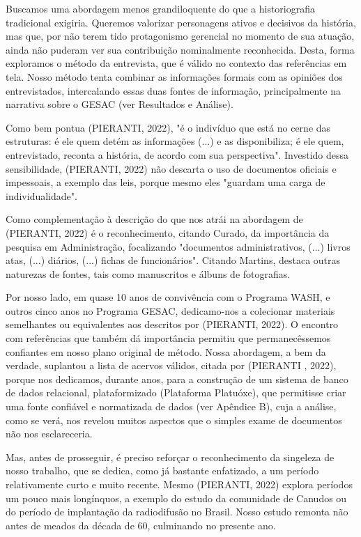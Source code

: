 Buscamos uma abordagem menos grandiloquente do que a historiografia tradicional exigiria. Queremos valorizar personagens ativos e decisivos da história, mas que, por não terem tido protagonismo gerencial no momento de sua atuação, ainda não puderam ver sua contribuição nominalmente reconhecida. Desta, forma exploramos o método da entrevista, que é válido no contexto das referências em tela. Nosso método tenta combinar as informações formais com as opiniões dos entrevistados, intercalando essas duas fontes de informação, principalmente na narrativa sobre o GESAC (ver Resultados e Análise).

Como bem pontua (PIERANTI, 2022), "é o indivíduo que está no cerne das estruturas: é ele quem detém as informações (...) e as disponibiliza; é ele quem, entrevistado, reconta a história, de acordo com sua perspectiva". Investido dessa sensibilidade,  (PIERANTI, 2022) não descarta o uso de documentos oficiais e impessoais, a exemplo das leis, porque mesmo eles "guardam uma carga de individualidade".

Como complementação à descrição do que nos atrái na abordagem de  (PIERANTI, 2022) é o reconhecimento, citando Curado, da importância da pesquisa em Administração, focalizando "documentos administrativos, (...) livros atas, (...) diários, (...) fichas de funcionários". Citando Martins, destaca outras naturezas de fontes, tais como manuscritos e álbuns de fotografias.

Por nosso lado, em quase 10 anos de convivência com o Programa WASH, e outros cinco anos no Programa GESAC, dedicamo-nos a colecionar materiais semelhantes ou equivalentes aos descritos por (PIERANTI, 2022). O encontro com referências que também dá importância permitiu que permanecêssemos confiantes em nosso plano original de método. Nossa abordagem, a bem da verdade, suplantou a lista de acervos válidos, citada por (PIERANTI , 2022), porque nos dedicamos, durante anos, para a construção de um sistema de banco de dados relacional, plataformizado (Plataforma Platuóxe), que permitisse criar uma fonte confiável e normatizada de dados (ver Apêndice B), cuja a análise, como se verá, nos revelou muitos aspectos que o simples exame de documentos não nos esclareceria.

Mas, antes de prosseguir, é preciso reforçar o reconhecimento da singeleza de nosso trabalho, que se dedica, como já bastante enfatizado, a um período relativamente curto e muito recente. Mesmo (PIERANTI, 2022) explora períodos um pouco mais longínquos, a exemplo do estudo da comunidade de Canudos ou do período de implantação da radiodifusão no Brasil. Nosso estudo remonta não antes de meados da década de 60, culminando no presente ano.

